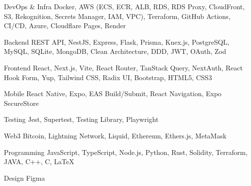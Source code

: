 

\begin{cvskills}

  \cvskill
    {DevOps \& Infra} %
    {Docker, AWS (ECS, ECR, ALB, RDS, RDS Proxy, CloudFront, S3, Rekognition, Secrets Manager, IAM, VPC), Terraform, GitHub Actions, CI/CD, Azure, Cloudflare Pages, Render} %

  \cvskill
    {Backend} %
    {REST API, NestJS, Express, Flask, Prisma, Knex.js, PostgreSQL, MySQL, SQLite, MongoDB, Clean Architecture, DDD, JWT, OAuth, Zod} %

  \cvskill
    {Frontend} %
    {React, Next.js, Vite, React Router, TanStack Query, NextAuth, React Hook Form, Yup, Tailwind CSS, Radix UI, Bootstrap, HTML5, CSS3} %

  \cvskill
    {Mobile} %
    {React Native, Expo, EAS Build/Submit, React Navigation, Expo SecureStore} %

  \cvskill
    {Testing} %
    {Jest, Supertest, Testing Library, Playwright} %

  \cvskill
    {Web3} %
    {Bitcoin, Lightning Network, Liquid, Ethereum, Ethers.js, MetaMask} %

  \cvskill
    {Programming} %
    {JavaScript, TypeScript, Node.js, Python, Rust, Solidity, Terraform, JAVA, C++, C, LaTeX} %

  \cvskill
    {Design} %
    {Figma} %

\end{cvskills}
